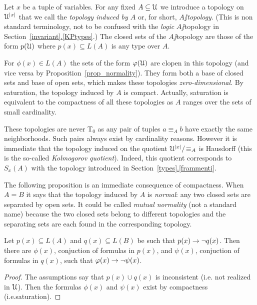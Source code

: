 \documentclass[creche.tex]{subfiles}
\begin{document}
Let $x$ be a tuple of variables. For any fixed $A\subseteq \EuScript U$ we introduce a topology on $\EuScript U^{|x|}$ that we call the \emph{topology induced by $A$} or, for short, \emph{$A\jj$topology}. (This is non standard terminology, not to be confused with the \textit{logic\/} $A\jj$topology in Section~\hyperref[invariant]{\ref*{invariant}.\ref*{KPtypes}}.) The closed sets of the $A\jj$topology are those of the form $p(\EuScript U)$ where $p(x)\subseteq L(A)$ is any type over $A$.

For $\phi(x)\in L(A)$ the sets of the form $\varphi(\EuScript U)$ are clopen in this topology (and vice versa by Proposition~\ref{prop_normality}). They form both a base of closed sets and base of open sets, which makes these topologies \textit{zero-dimensional}. By saturation, the topology induced by $A$ is compact. Actually, saturation is equivalent to the compactness of all these topologies as $A$ ranges over the sets of small cardinality.

These topologies are never T$_0$ as any pair of tuples $a\equiv_A b$ have exactly the same neighborhoods. Such pairs always exist by cardinality reasons. However it is immediate that the topology induced on the quotient $\EuScript U^{|x|}/\!\equiv_A$ is Hausdorff (this is the so-called \textit{Kolmogorov quotient}). Indeed, this quotient corresponds to $S_x(A)$ with the topology introduced in Section~\hyperref[frammenti]{\ref{types}.\ref*{frammenti}}.

The following proposition is an immediate consequence of compactness. When $A=B$ it says that the topology induced by $A$ is \textit{normal}: any two closed sets are separated by open sets. It could be called \emph{mutual normality\/} (not a standard name) because the two closed sets belong to different topologies and the separating sets are each found in the corresponding topology.


\begin{proposition}\label{prop_normality}
Let $p(x)\subseteq L(A)$ and $q(x)\subseteq L(B)$ be such that $p(x)\rightarrow \neg q(x)$. Then there are $\phi(x)$, conjuction of formulas in $p(x)$, and $\psi(x)$, conjuction of formulas in $q(x)$, such that $\varphi(x)\rightarrow\neg\psi(x)$.
\end{proposition}

\begin{proof}
The assumptions say that $p(x)\cup q(x)$ is inconsistent (i.e. not realized in $\EuScript U$). Then the formulas $\phi(x)$ and $\psi(x)$ exist by compactness (i.e.\@ saturation).
\end{proof}
\end{document}
